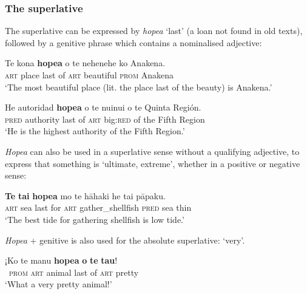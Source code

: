\subsubsection[The superlative]{The superlative}\label{sec:3.5.2.2}
The superlative can be expressed by \textit{hope{\ꞌ}a} ‘last’ (a  loan not found in old texts), followed by a genitive phrase which contains a nominalised adjective:

\ea\label{ex:3.117}
\gll Te kona \textbf{hope{\ꞌ}a} o te nehenehe ko {\ꞌ}Anakena. \\
\textsc{art} place last of \textsc{art} beautiful \textsc{prom} Anakena \\

\glt 
‘The most beautiful place (lit. the place last of the beauty) is Anakena.’ \textstyleExampleref{[R350.013]} 
\z

\ea\label{ex:3.118}
\gll He autoridad \textbf{hope{\ꞌ}a} o te nuinui o te Quinta Región. \\
\textsc{pred} authority last of \textsc{art} big:\textsc{red} of the Fifth Region \\

\glt
‘He is the highest authority of the Fifth Region.’ \textstyleExampleref{[R203.018]} 
\z

\textit{Hope{\ꞌ}a} can also be used in a superlative sense without a qualifying adjective, to express that something is ‘ultimate, extreme’, whether in a positive or negative sense:

\ea\label{ex:3.119}
\gll \textbf{Te} \textbf{tai} \textbf{hope{\ꞌ}a} mo te hāhaki he tai pāpaku. \\
\textsc{art} sea last for \textsc{art} gather\_shellfish \textsc{pred} sea thin \\

\glt
‘The best tide for gathering shellfish is low tide.’ \textstyleExampleref{[R353.018]} 
\z

\textit{Hope{\ꞌ}a} + genitive is also used for the absolute superlative: ‘very’.

\ea\label{ex:3.120}
\gll ¡Ko te manu \textbf{hope{\ꞌ}a} \textbf{o} \textbf{te} \textbf{tau}! \\
~\textsc{prom} \textsc{art} animal last of \textsc{art} pretty \\

\glt 
‘What a very pretty animal!’ \textstyleExampleref{[R345.072]} 
\z

